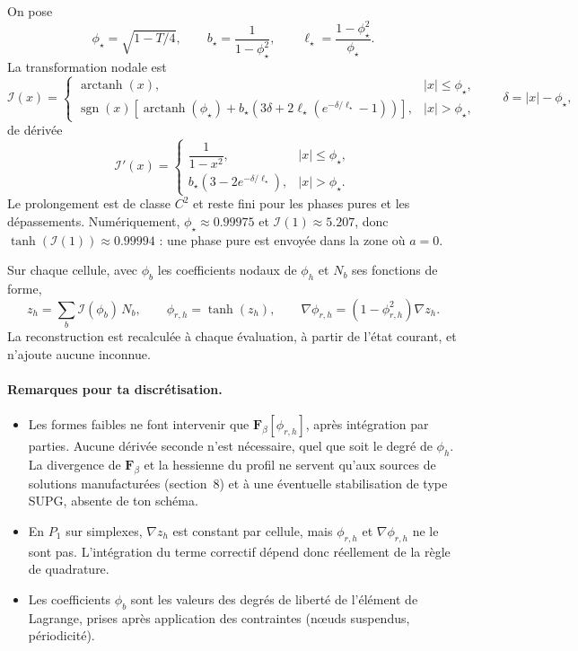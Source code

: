 On pose
\begin{equation}
  \phi_\star = \sqrt{1-T/4},
  \qquad
  b_\star = \frac{1}{1-\phi_\star^{2}},
  \qquad
  \ell_\star = \frac{1-\phi_\star^{2}}{\phi_\star} .
\end{equation}
La transformation nodale est
\begin{equation}\label{cp:I}
  \mathcal{I}(x) =
  \begin{cases}
    \operatorname{arctanh}(x), & |x| \le \phi_\star,\\[4pt]
    \operatorname{sgn}(x)\left[\operatorname{arctanh}(\phi_\star)
      + b_\star\left(3\delta + 2\ell_\star\left(e^{-\delta/\ell_\star}-1\right)\right)\right],
    & |x| > \phi_\star,
  \end{cases}
  \qquad
  \delta = |x|-\phi_\star,
\end{equation}
de dérivée
\begin{equation}\label{cp:Iprime}
  \mathcal{I}'(x) =
  \begin{cases}
    \dfrac{1}{1-x^{2}}, & |x| \le \phi_\star,\\[8pt]
    b_\star\left(3 - 2e^{-\delta/\ell_\star}\right), & |x| > \phi_\star .
  \end{cases}
\end{equation}
Le prolongement est de classe $C^{2}$ et reste fini pour les phases pures et les dépassements. Numériquement, $\phi_\star\approx0.99975$ et $\mathcal{I}(1)\approx5.207$, donc $\tanh(\mathcal{I}(1))\approx0.99994$ : une phase pure est envoyée dans la zone où $a=0$.

Sur chaque cellule, avec $\phi_b$ les coefficients nodaux de $\phi_h$ et $N_b$ ses fonctions de forme,
\begin{equation}\label{cp:reconstruction}
  z_h = \sum_{b}\mathcal{I}(\phi_b)\,N_b,
  \qquad
  \phi_{r,h} = \tanh(z_h),
  \qquad
  \nabla\phi_{r,h} = \left(1-\phi_{r,h}^{2}\right)\nabla z_h .
\end{equation}
La reconstruction est recalculée à chaque évaluation, à partir de l'état courant, et n'ajoute aucune inconnue.

\paragraph{Remarques pour ta discrétisation.}
\begin{itemize}
  \item Les formes faibles ne font intervenir que $\mathbf{F}_\beta[\phi_{r,h}]$, après intégration par parties. Aucune dérivée seconde n'est nécessaire, quel que soit le degré de $\phi_h$. La divergence de $\mathbf{F}_\beta$ et la hessienne du profil ne servent qu'aux sources de solutions manufacturées (section~8) et à une éventuelle stabilisation de type SUPG, absente de ton schéma.
  \item En $P_1$ sur simplexes, $\nabla z_h$ est constant par cellule, mais $\phi_{r,h}$ et $\nabla\phi_{r,h}$ ne le sont pas. L'intégration du terme correctif dépend donc réellement de la règle de quadrature.
  \item Les coefficients $\phi_b$ sont les valeurs des degrés de liberté de l'élément de Lagrange, prises après application des contraintes (nœuds suspendus, périodicité).
\end{itemize}

